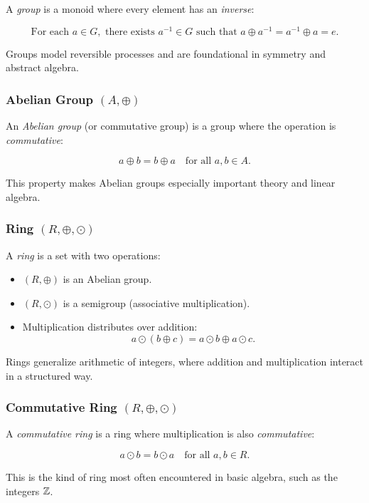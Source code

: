 A \emph{group} is a monoid where every element has an \emph{inverse}:

\[
  \text{For each } a \in G, \text{ there exists } a^{-1} \in G \text{ such that } a \oplus a^{-1} = a^{-1} \oplus a = e.
\]

Groups model reversible processes and are foundational in symmetry and abstract algebra.

\subsubsection{Abelian Group \texorpdfstring{\((A, \oplus)\)}{}}

An \emph{Abelian group} (or commutative group) is a group where the operation is \emph{commutative}:

\[
    a \oplus b = b \oplus a \quad \text{for all } a, b \in A.
\]

This property makes Abelian groups especially important theory and linear algebra.

\subsubsection{Ring \texorpdfstring{\((R, \oplus, \odot)\)}{}}

A \emph{ring} is a set with two operations:

\begin{itemize}
  \item \((R, \oplus)\) is an Abelian group.
  \item \((R, \odot)\) is a semigroup (associative multiplication).
  \item Multiplication distributes over addition:
  \[
  a \odot (b \oplus c) = a \odot b \oplus a \odot c.
  \]
\end{itemize}

Rings generalize arithmetic of integers, where addition and multiplication interact in a structured way.

\subsubsection{Commutative Ring \texorpdfstring{\((R, \oplus, \odot)\)}{}}

A \emph{commutative ring} is a ring where multiplication is also \emph{commutative}:

\[
  a \odot b = b \odot a \quad \text{for all } a, b \in R.
\]

This is the kind of ring most often encountered in basic algebra, such as the integers \(\mathbb{Z}\).

